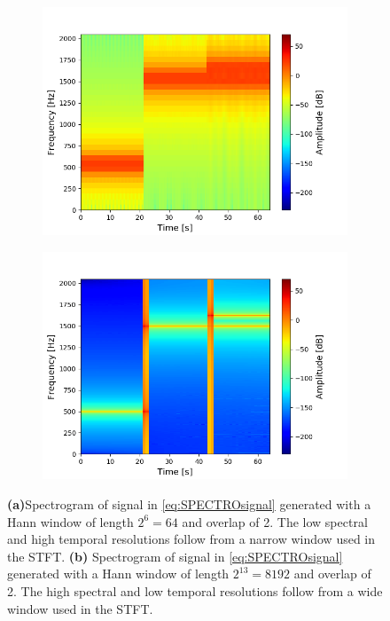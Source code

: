 \begin{figure}[H]
\centering
\begin{subfigure}{0.49\textwidth}
\centering
\includegraphics[width=\textwidth]{figures/validation/stft/1.png}
\caption{}
\label{fig:test_stft2}
\end{subfigure}
\begin{subfigure}{0.49\textwidth}
\centering
\includegraphics[width=\textwidth]{figures/validation/stft/2.png}
\caption{}
\label{fig:test_stft1}
\end{subfigure}
\caption{\textbf{(a)}Spectrogram of signal in \eqref{eq:SPECTROsignal} generated with a Hann window of length $2^6=64$ and overlap of 2. The low spectral and high temporal resolutions follow from a narrow window used in the STFT. \textbf{(b)} Spectrogram of signal in \eqref{eq:SPECTROsignal} generated with a Hann window of length $2^{13}=8192$ and overlap of 2. The high spectral and low temporal resolutions follow from a wide window used in the STFT.}
\label{fig:test_stft}
\end{figure}
